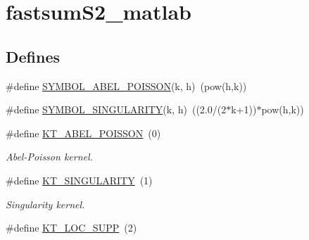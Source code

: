 \hypertarget{group__applications__fastsumS2__test}{
\section{fastsumS2\_\-matlab}
\label{group__applications__fastsumS2__test}
}
\subsection*{Defines}
\begin{CompactItemize}
\item 
\hypertarget{group__applications__fastsumS2__test_g0512f12a35b9bcac68ac0d36cd9b50d5}{
\#define \hyperlink{group__applications__fastsumS2__test_g0512f12a35b9bcac68ac0d36cd9b50d5}{SYMBOL\_\-ABEL\_\-POISSON}(k, h)~(pow(h,k))}
\label{group__applications__fastsumS2__test_g0512f12a35b9bcac68ac0d36cd9b50d5}

\item 
\hypertarget{group__applications__fastsumS2__test_g580e1a9e3fba99e0750908b58010dc00}{
\#define \hyperlink{group__applications__fastsumS2__test_g580e1a9e3fba99e0750908b58010dc00}{SYMBOL\_\-SINGULARITY}(k, h)~((2.0/(2$\ast$k+1))$\ast$pow(h,k))}
\label{group__applications__fastsumS2__test_g580e1a9e3fba99e0750908b58010dc00}

\item 
\hypertarget{group__applications__fastsumS2__test_g0452118afd292fc346ed8116915d001e}{
\#define \hyperlink{group__applications__fastsumS2__test_g0452118afd292fc346ed8116915d001e}{KT\_\-ABEL\_\-POISSON}~(0)}
\label{group__applications__fastsumS2__test_g0452118afd292fc346ed8116915d001e}

\begin{CompactList}\small\item\em Abel-Poisson kernel. \item\end{CompactList}\item 
\hypertarget{group__applications__fastsumS2__test_g814ba1b58f017f7a67a85f68d4719814}{
\#define \hyperlink{group__applications__fastsumS2__test_g814ba1b58f017f7a67a85f68d4719814}{KT\_\-SINGULARITY}~(1)}
\label{group__applications__fastsumS2__test_g814ba1b58f017f7a67a85f68d4719814}

\begin{CompactList}\small\item\em Singularity kernel. \item\end{CompactList}\item 
\hypertarget{group__applications__fastsumS2__test_ge2a54d1d59448d9f02697f89a6ec7306}{
\#define \hyperlink{group__applications__fastsumS2__test_ge2a54d1d59448d9f02697f89a6ec7306}{KT\_\-LOC\_\-SUPP}~(2)}
\label{group__applications__fastsumS2__test_ge2a54d1d59448d9f02697f89a6ec7306}


\end{CompactItemize}
